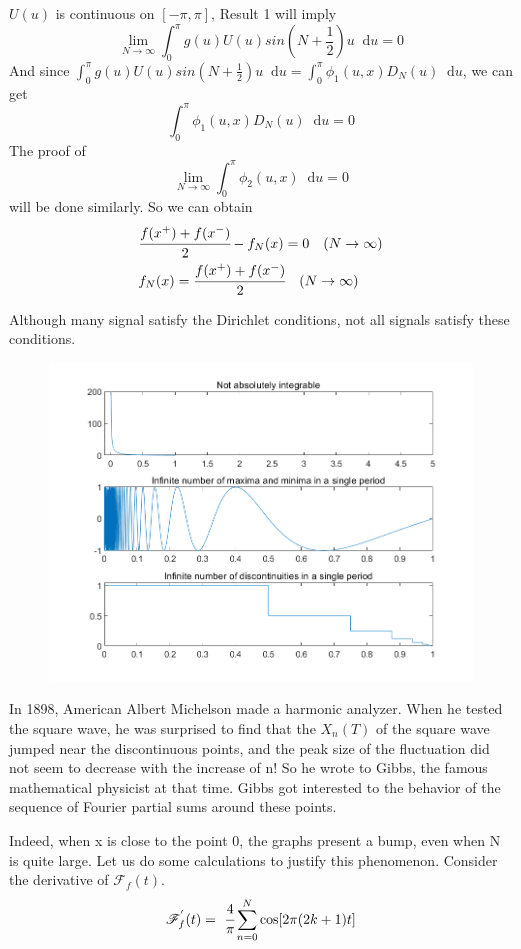 \documentclass[margin,line]{res}
\newcommand*{\dif}{\mathop{}\!\mathrm{d}}
\begin{document}
\begin{resume}
\begin{itemize}
$$$$
$U(u)$ is continuous on $\left[-\pi,\pi\right]$, Result 1 will imply
$$
\lim_{N \rightarrow \infty}\int_{0}^{\pi}g(u)U(u)sin(N+\frac{1}{2})u \dif u = 0
$$
And since $\int_{0}^{\pi}g(u)U(u)sin(N+\frac{1}{2})u \dif u = \int_{0}^{\pi}\phi_{1}(u,x)D_N(u)\dif u$, we can get
$$
\int_{0}^{\pi} \phi_{1}(u,x)D_N(u)\dif u = 0
$$
The proof of 
$$
\lim_{N \rightarrow \infty}\int_{0}^{\pi}\phi_{2}(u,x)\dif u=0
$$
will be done similarly.
So we can obtain 
\begin{align}
	& \cfrac{f(x^{+})+f(x^{-})}{2}-f_N(x)=0 \quad (N \rightarrow \infty) \nonumber \\
	& f_N(x)=\cfrac{f(x^{+})+f(x^{-})}{2} \quad (N \rightarrow \infty) \nonumber
\end{align}
\end{itemize}
Although many signal satisfy the Dirichlet conditions, not all signals satisfy these conditions.
\begin{figure}[H]
	\centerline{\includegraphics[width=0.75\linewidth]{figure/fig_6.png}}
\end{figure}
In 1898, American Albert Michelson made a harmonic analyzer. When he tested the square wave, he was surprised to find that the $X_n(T)$ of the square wave jumped near the discontinuous points, and the peak size of the fluctuation did not seem to decrease with the increase of n! So he wrote to Gibbs, the famous mathematical physicist at that time. Gibbs got interested to the behavior of the sequence of Fourier partial sums around these points. \par
Indeed, when x is close to the point 0, the graphs present a bump, even when N is quite large. Let us do some calculations to justify this phenomenon. Consider the derivative of $\mathscr{F}_f(t)$.
\begin{align}
\mathscr{F}^{'}_f(t) 
	&= \ \cfrac{4}{\pi} \sum\limits_{n=0}^N{\cos [2\pi (2k+1)t]} \nonumber \\

\end{align}
\end{resume}
\end{document}
